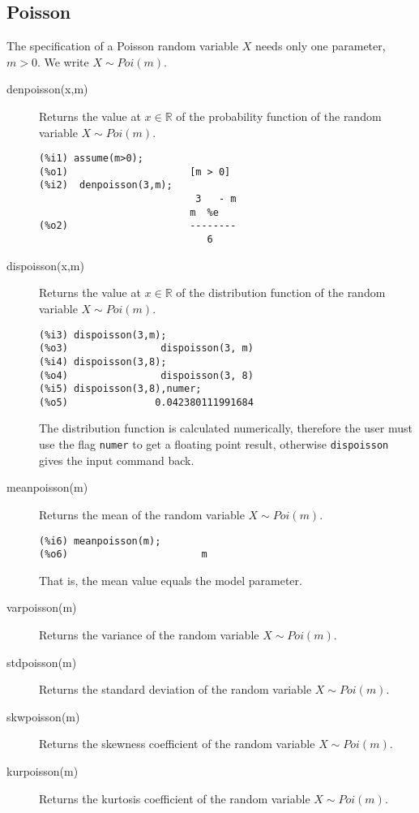 \documentclass[12pt,a4paper]{article}
\newcommand{\R}{\mathbb{R}}
\begin{document}
\subsection{Poisson}

The specification of a Poisson random variable $X$ needs only one parameter,  $m > 0$. We write $X \sim Poi(m)$.

\begin{description}

\item[denpoisson(x,m)] Returns the value at $x \in \R$ of the probability function of the random variable $X \sim Poi(m)$.

\begin{verbatim}
(%i1) assume(m>0);
(%o1)                     [m > 0]
(%i2)  denpoisson(3,m);
                           3   - m
                          m  %e
(%o2)                     --------
                             6
\end{verbatim}

\item[dispoisson(x,m)] Returns the value at $x \in \R$ of the distribution function of the random variable $X \sim Poi(m)$.

\begin{verbatim}
(%i3) dispoisson(3,m);
(%o3)                dispoisson(3, m)
(%i4) dispoisson(3,8);
(%o4)                dispoisson(3, 8)
(%i5) dispoisson(3,8),numer;
(%o5)               0.042380111991684
\end{verbatim}
The distribution function is calculated numerically, therefore the user must use the flag \verb|numer| to get a floating point result, otherwise \verb|dispoisson| gives the input command back.

\item[meanpoisson(m)] Returns the mean of the random variable  $X \sim Poi(m)$.

\begin{verbatim}
(%i6) meanpoisson(m);
(%o6)                       m
\end{verbatim}
That is, the mean value equals the model parameter.

\item[varpoisson(m)] Returns the variance of the random variable  $X \sim Poi(m)$.

\item[stdpoisson(m)] Returns the standard deviation of the random variable  $X \sim Poi(m)$.

\item[skwpoisson(m)] Returns the skewness coefficient of the random variable  $X \sim Poi(m)$.

\item[kurpoisson(m)] Returns the kurtosis coefficient of the random variable  $X \sim Poi(m)$.

\end{description}
\end{document}
